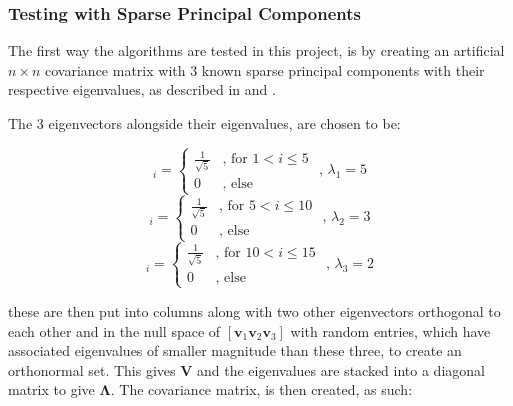 \documentclass[11pt,a4paper]{article}
\begin{document}
\subsubsection{Testing with Sparse Principal Components}

The first way the algorithms are tested in this project, is by creating an artificial $n \times n$ covariance matrix with 3 known sparse principal components with their respective eigenvalues, as described in \cite{truncpower} and \cite{shen}. 

The 3 eigenvectors alongside their eigenvalues, are chosen to be:

\begin{equation*}
[\mathbf{v}_1]_i = \begin{cases}
       \frac{1}{\sqrt{5}} & \text{, for } 1<i\le 5 \\
       0 & \text{, else }
        \end{cases}
        \text{              , } \lambda_1 = 5
\end{equation*}
\begin{equation*}
[\mathbf{v}_2]_i = \begin{cases}
       \frac{1}{\sqrt{5}} & \text{, for } 5<i\le 10  \\
       0 & \text{, else }
        \end{cases}
        \text{              , } \lambda_2 = 3
\end{equation*}
\begin{equation*}
[\mathbf{v}_3]_i = \begin{cases}
       \frac{1}{\sqrt{5}} & \text{, for } 10<i\le 15  \\
       0 & \text{, else }
	  \end{cases}  
	  \text{              , } \lambda_3 = 2  
\end{equation*}
       
these are then put into columns along with two other eigenvectors orthogonal to each other and in the null space of $[\mathbf{v}_1 \mathbf{v}_2 \mathbf{v}_3]$ with random entries, which have associated eigenvalues of smaller magnitude than these three, to create an orthonormal set. This gives $\mathbf{V}$ and the eigenvalues are stacked into a diagonal matrix to give $\mathbf{\Lambda}$. The covariance matrix, is then created, as such:
\end{document}
